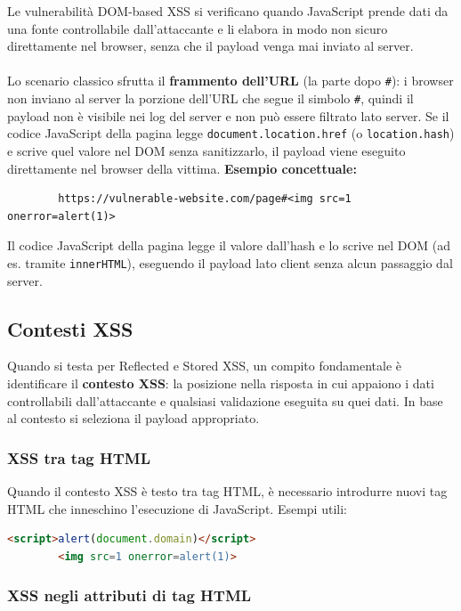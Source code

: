 \documentclass[12pt,a4paper]{report}
\begin{document}
	Le vulnerabilità DOM-based XSS si verificano quando JavaScript prende dati da una fonte controllabile dall'attaccante e li elabora in modo non sicuro direttamente nel browser, senza che il payload venga mai inviato al server.\\\\
	Lo scenario classico sfrutta il \textbf{frammento dell'URL} (la parte dopo \texttt{\#}): i browser non inviano al server la porzione dell'URL che segue il simbolo \texttt{\#}, quindi il payload non è visibile nei log del server e non può essere filtrato lato server. Se il codice JavaScript della pagina legge \texttt{document.location.href} (o \texttt{location.hash}) e scrive quel valore nel DOM senza sanitizzarlo, il payload viene eseguito direttamente nel browser della vittima.
	\textbf{Esempio concettuale:}
	
	\begin{lstlisting}
		https://vulnerable-website.com/page#<img src=1 onerror=alert(1)>
	\end{lstlisting}
	Il codice JavaScript della pagina legge il valore dall'hash e lo scrive nel DOM (ad es. tramite \texttt{innerHTML}), eseguendo il payload lato client senza alcun passaggio dal server.
	
	\subsection{Contesti XSS}
	
	Quando si testa per Reflected e Stored XSS, un compito fondamentale è identificare il \textbf{contesto XSS}: la posizione nella risposta in cui appaiono i dati controllabili dall'attaccante e qualsiasi validazione eseguita su quei dati. In base al contesto si seleziona il payload appropriato.
	
	\subsubsection{XSS tra tag HTML}
	
	Quando il contesto XSS è testo tra tag HTML, è necessario introdurre nuovi tag HTML che inneschino l'esecuzione di JavaScript. Esempi utili:
	
	\begin{lstlisting}[language=HTML]
		<script>alert(document.domain)</script>
		<img src=1 onerror=alert(1)>
	\end{lstlisting}
	
	\subsubsection{XSS negli attributi di tag HTML}
	
\end{document}

